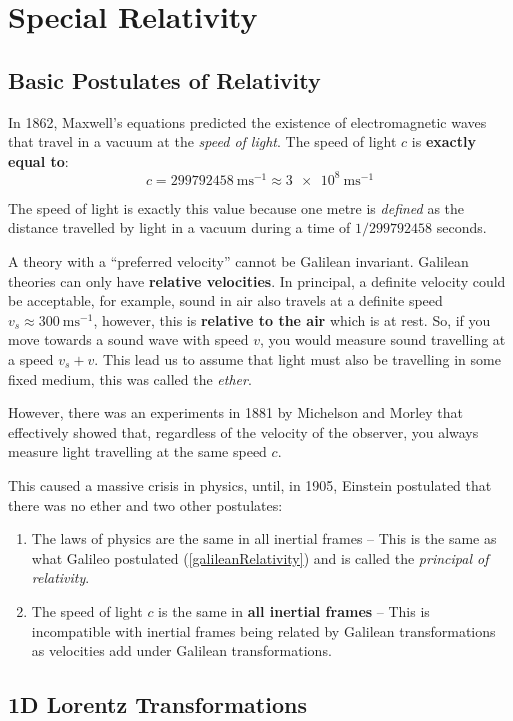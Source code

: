 \documentclass[../main.tex]{subfiles}
\begin{document}
\chapter{Special Relativity} \label{chapter7}
\section{Basic Postulates of Relativity}
In 1862, Maxwell's equations predicted the existence of electromagnetic waves that travel in a vacuum at the \textit{speed of light}.
The speed of light $c$ is \textbf{exactly equal to}:
\[
  c = \qty{299792458}{\metre\second^{-1}} \approx \qty{3e8}{\metre\second^{-1}}
\]
\begin{remark}[Note]
  The speed of light is exactly this value because one metre is \textit{defined} as the distance travelled by light in a vacuum during a time of $1/299792458$ seconds.
\end{remark}

A theory with a ``preferred velocity'' cannot be Galilean invariant.
Galilean theories can only have \textbf{relative velocities}.
In principal, a definite velocity could be acceptable, for example, sound in air also travels at a definite speed $v_{s} \approx \qty{300}{\metre\second^{-1}}$, however, this is \textbf{relative to the air} which is at rest.
So, if you move towards a sound wave with speed $v$, you would measure sound travelling at a speed $v_s + v$.
This lead us to assume that light must also be travelling in some fixed medium, this was called the \textit{ether}.

However, there was an experiments in 1881 by Michelson and Morley that effectively showed that, regardless of the velocity of the observer, you always measure light travelling at the same speed $c$.

This caused a massive crisis in physics, until, in 1905, Einstein postulated that there was no ether and two other postulates:
\begin{enumerate}
  \item The laws of physics are the same in all inertial frames -- This is the same as what Galileo postulated (\cref{galileanRelativity}) and is called the \textit{principal of relativity}.
  \item The speed of light $c$ is the same in \textbf{all inertial frames} -- This is incompatible with inertial frames being related by Galilean transformations as velocities add under Galilean transformations.
\end{enumerate}
\section{1D Lorentz Transformations}
\end{document}
